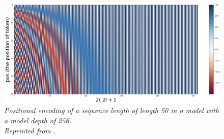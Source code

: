 \begin{figure}[H]
  \centering
  \caption[Positional encoding of a sequence length of length 50 in a model with a model depth of 256.]{\emph{Positional encoding of a sequence length of length 50 in a model with a model depth of 256. \\ Reprinted from \citeauthor{tamura_2021} \citeyear{tamura_2021}.}}\label{fig:attention_7}
  \includegraphics[scale = 0.15]{figures/positional_encoding.jpg}  
\end{figure}


\FloatBarrier
